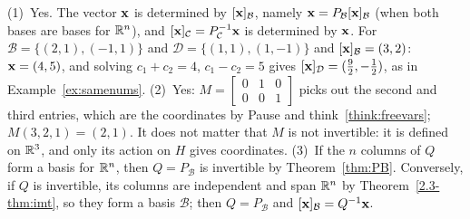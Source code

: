 \documentclass[11pt]{article}
\begin{document}
\begin{description}[leftmargin=0pt,itemsep=5pt]
  \item[Before the next section.] (1)~Yes. The vector $\mathbf{x}$ is determined by $[\mathbf{x}]_{\mathcal{B}}$, namely $\mathbf{x}=P_{\mathcal{B}}[\mathbf{x}]_{\mathcal{B}}$ (when both bases are bases for $\mathbb{R}^n$), and $[\mathbf{x}]_{\mathcal{C}}=P_{\mathcal{C}}^{-1}\mathbf{x}$ is determined by $\mathbf{x}$. For $\mathcal{B}=\{(2,1),(-1,1)\}$ and $\mathcal{D}=\{(1,1),(1,-1)\}$ and $[\mathbf{x}]_{\mathcal{B}}=(3,2)$: $\mathbf{x}=(4,5)$, and solving $c_1+c_2=4$, $c_1-c_2=5$ gives $[\mathbf{x}]_{\mathcal{D}}=(\tfrac92,-\tfrac12)$, as in Example~\ref{ex:samenums}. (2)~Yes: $M=\begin{bmatrix}0&1&0\\0&0&1\end{bmatrix}$ picks out the second and third entries, which are the coordinates by Pause and think~\ref{think:freevars}; $M(3,2,1)=(2,1)$. It does not matter that $M$ is not invertible: it is defined on $\mathbb{R}^3$, and only its action on $H$ gives coordinates. (3)~If the $n$ columns of $Q$ form a basis for $\mathbb{R}^n$, then $Q=P_{\mathcal{B}}$ is invertible by Theorem~\ref{thm:PB}. Conversely, if $Q$ is invertible, its columns are independent and span $\mathbb{R}^n$ by Theorem~\ref{2.3-thm:imt}, so they form a basis $\mathcal{B}$; then $Q=P_{\mathcal{B}}$ and $[\mathbf{x}]_{\mathcal{B}}=Q^{-1}\mathbf{x}$.
\end{description}
\end{document}
